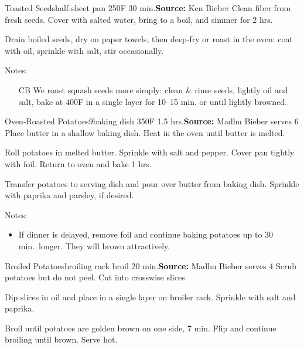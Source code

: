 \begin{recipe}{Toasted Seeds}{half-sheet pan \hfill 250\0F \hfill 30 min.}{\textbf{Source:} Ken Bieber \hfill }
 Clean fiber from fresh seeds. Cover with salted water, bring to a boil, and simmer for 2 hrs.

 \newstep Drain boiled seeds, dry on paper towels, then deep-fry or roast in the oven: coat with oil, sprinkle with salt, stir occasionally.

 \freeform Notes:
 \begin{itemize}
  \item [CB] We roast squash seeds more simply: clean \& rinse seeds, lightly oil and salt, bake at 400\0F in a single layer for 10--15 min. or until lightly browned.
 \end{itemize}
\end{recipe}

\begin{recipe}{Oven-Roasted Potatoes}{9\inch{}\inch baking dish \hfill 350\0F \hfill 1.5 hrs.}{\textbf{Source:} Madhu Bieber \hfill serves 6}
 Place butter in a shallow baking dish. Heat in the oven until butter is melted.

 Roll potatoes in melted butter. Sprinkle with salt and pepper. Cover pan tightly with foil. Return to oven and bake 1 hrs.

 Transfer potatoes to serving dish and pour over butter from baking dish. Sprinkle with paprika and parsley, if desired.

 \freeform Notes:
 \begin{itemize}
  \item If dinner is delayed, remove foil and continue baking potatoes up to 30 min.\ longer. They will brown attractively.
 \end{itemize}
\end{recipe}

\begin{recipe}{Broiled Potatoes}{broiling rack \hfill broil \hfill 20 min.}{\textbf{Source:} Madhu Bieber \hfill serves 4}
 Scrub potatoes but do not peel. Cut into \inch crosswise slices.

 Dip slices in oil and place in a single layer on broiler rack. Sprinkle with salt and paprika.

 \newstep Broil until potatoes are golden brown on one side, \~7 min. Flip and continue broiling until brown. Serve hot.
\end{recipe}

